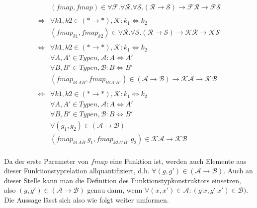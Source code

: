 \begin{align*}
&(fmap, fmap) \in \forall \mathcal{F} . \forall \mathcal{R} . \forall \mathcal{S} . (\mathcal{R} \rightarrow \mathcal{S})
\rightarrow \mathcal{F} \mathcal{R} \rightarrow \mathcal{F} \mathcal{S} \\
&\\
\Leftrightarrow &
\forall k1, k2 \in (* \rightarrow *), \mathcal{K} : k_1 \Leftrightarrow k_2 \\
&(fmap_{k1}, fmap_{k2}) \in \forall \mathcal{R} . \forall \mathcal{S} . (\mathcal{R} \rightarrow \mathcal{S}) \rightarrow
\mathcal{K} \mathcal{R} \rightarrow \mathcal{K} \mathcal{S} \\
&\\
\Leftrightarrow &
\forall k1, k2 \in (* \rightarrow *), \mathcal{K} : k_1 \Leftrightarrow k_2 \\
&\forall A, A' \in Typen, \mathcal{A} : A \Leftrightarrow A' \\
&\forall B, B' \in Typen, \mathcal{B} : B \Leftrightarrow B' \\
&(fmap_{k1 A B}, fmap_{k2 A' B'}) \in (\mathcal{A} \rightarrow \mathcal{B}) \rightarrow
\mathcal{K} \mathcal{A} \rightarrow \mathcal{K} \mathcal{B} \\
&\\
\Leftrightarrow &
\forall k1, k2 \in (* \rightarrow *), \mathcal{K} : k_1 \Leftrightarrow k_2 \\
&\forall A, A' \in Typen, \mathcal{A} : A \Leftrightarrow A' \\
&\forall B, B' \in Typen, \mathcal{B} : B \Leftrightarrow B' \\
&\forall (g_1, g_2) \in (\mathcal{A} \rightarrow \mathcal{B}) \\
&(fmap_{k1 A B}\ g_1, fmap_{k2 A' B'}\ g_2) \in \mathcal{K} \mathcal{A} \rightarrow \mathcal{K} \mathcal{B} \\
\end{align*}

Da der erste Parameter von $fmap$ eine Funktion ist, werden auch Elemente aus dieser Funktionstyprelation allquantifiziert, d.h.
$\forall (g, g') \in (\mathcal{A} \rightarrow \mathcal{B})$. Auch an dieser Stelle kann man die Definition des Funktionstypkonstruktors
einsetzen, also $(g, g') \in (\mathcal{A} \rightarrow \mathcal{B})$ genau dann, wenn $\forall (x, x') \in \mathcal{A}: (g\ x, g'\ x')
\in \mathcal{B})$. Die Aussage lässt sich also wie folgt weiter umformen.



